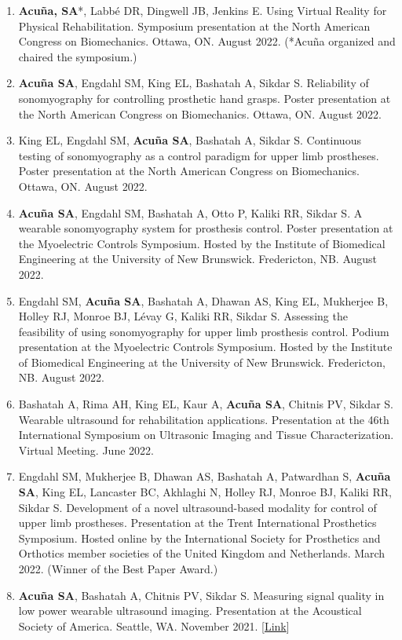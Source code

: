 \documentclass[letterpaper, 10pt]{article}
\begin{document}
\begin{enumerate}
    \item \textbf{Acuña, SA}*, Labbé DR, Dingwell JB, Jenkins E. Using Virtual Reality for Physical Rehabilitation. Symposium presentation at the North American Congress on Biomechanics. Ottawa, ON. August 2022. (*Acuña organized and chaired the symposium.)
    \item \textbf{Acuña SA}, Engdahl SM, King EL, Bashatah A, Sikdar S. Reliability of sonomyography for controlling prosthetic hand grasps. Poster presentation at the North American Congress on Biomechanics. Ottawa, ON. August 2022.
    \item King EL, Engdahl SM, \textbf{Acuña SA}, Bashatah A, Sikdar S. Continuous testing of sonomyography as a control paradigm for upper limb prostheses. Poster presentation at the North American Congress on Biomechanics. Ottawa, ON. August 2022.
    \item \textbf{Acuña SA}, Engdahl SM, Bashatah A, Otto P, Kaliki RR, Sikdar S. A wearable sonomyography system for prosthesis control. Poster presentation at the Myoelectric Controls Symposium. Hosted by the Institute of Biomedical Engineering at the University of New Brunswick. Fredericton, NB. August 2022.
    \item Engdahl SM, \textbf{Acuña SA}, Bashatah A, Dhawan AS, King EL, Mukherjee B, Holley RJ, Monroe BJ, Lévay G, Kaliki RR, Sikdar S. Assessing the feasibility of using sonomyography for upper limb prosthesis control. Podium presentation at the Myoelectric Controls Symposium. Hosted by the Institute of Biomedical Engineering at the University of New Brunswick. Fredericton, NB. August 2022.
    \item Bashatah A, Rima AH, King EL, Kaur A, \textbf{Acuña SA}, Chitnis PV, Sikdar S. Wearable ultrasound for rehabilitation applications. Presentation at the 46th International Symposium on Ultrasonic Imaging and Tissue Characterization. Virtual Meeting. June 2022.
    \item Engdahl SM, Mukherjee B, Dhawan AS, Bashatah A, Patwardhan S, \textbf{Acuña SA}, King EL, Lancaster BC, Akhlaghi N, Holley RJ, Monroe BJ, Kaliki RR, Sikdar S. Development of a novel ultrasound-based modality for control of upper limb prostheses. Presentation at the Trent International Prosthetics Symposium. Hosted online by the International Society for Prosthetics and Orthotics member societies of the United Kingdom and Netherlands. March 2022. (Winner of the Best Paper Award.)
    \item \textbf{Acuña SA}, Bashatah A, Chitnis PV, Sikdar S. Measuring signal quality in low power wearable ultrasound imaging. Presentation at the Acoustical Society of America. Seattle, WA. November 2021. [\href{https://asa.scitation.org/doi/10.1121/10.0007727}{Link}]

\end{enumerate}
\end{document}
